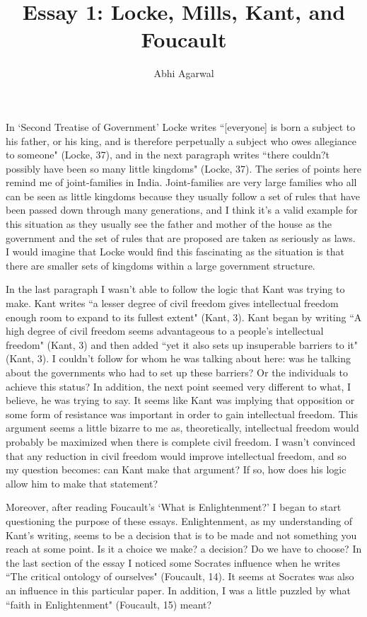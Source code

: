 \documentclass[11pt, oneside]{article}
\title{Essay 1: Locke, Mills, Kant, and Foucault}
\author{Abhi Agarwal}
\date{}
\begin{document}
\maketitle

\par In `Second Treatise of Government' Locke writes ``[everyone] is born a subject to his father, or his king, and is therefore perpetually a subject who owes allegiance to someone" (Locke, 37), and in the next paragraph writes ``there couldn?t possibly have been so many little kingdoms" (Locke, 37). The series of points here remind me of joint-families in India. Joint-families are very large families who all can be seen as little kingdoms because they usually follow a set of rules that have been passed down through many generations, and I think it's a valid example for this situation as they usually see the father and mother of the house as the government and the set of rules that are proposed are taken as seriously as laws. I would imagine that Locke would find this fascinating as the situation is that there are smaller sets of kingdoms within a large government structure. 

\par In the last paragraph I wasn't able to follow the logic that Kant was trying to make. Kant writes ``a lesser degree of civil freedom gives intellectual freedom enough room to expand to its fullest extent" (Kant, 3). Kant began by writing ``A high degree of civil freedom seems advantageous to a people's intellectual freedom" (Kant, 3) and then added ``yet it also sets up insuperable barriers to it" (Kant, 3). I couldn't follow for whom he was talking about here: was he talking about the governments who had to set up these barriers? Or the individuals to achieve this status? In addition, the next point seemed very different to what, I believe, he was trying to say. It seems like Kant was implying that opposition or some form of resistance was important in order to gain intellectual freedom. This argument seems a little bizarre to me as, theoretically, intellectual freedom would probably be maximized when there is complete civil freedom. I wasn't convinced that any reduction in civil freedom would improve intellectual freedom, and so my question becomes: can Kant make that argument? If so, how does his logic allow him to make that statement?

\par Moreover, after reading Foucault's `What is Enlightenment?' I began to start questioning the purpose of these essays. Enlightenment, as my understanding of Kant's writing, seems to be a decision that is to be made and not something you reach at some point. Is it a choice we make? a decision? Do we have to choose? In the last section of the essay I noticed some Socrates influence when he writes ``The critical ontology of ourselves" (Foucault, 14). It seems at Socrates was also an influence in this particular paper. In addition, I was a little puzzled by what ``faith in Enlightenment" (Foucault, 15) meant?
\end{document}
